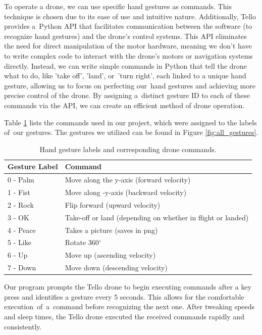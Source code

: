 To operate a drone, we can use specific hand gestures as commands. This technique is chosen due to its ease of use and intuitive nature. Additionally, Tello provides a~Python API that facilitates communication between the software (to recognize hand gestures) and the drone's control systems.
This API eliminates the need for direct manipulation of the motor hardware, meaning we don't have to write complex code to interact with the drone's motors or navigation systems directly.  Instead, we can write simple commands in Python that tell the drone what to do, like 'take off', 'land', or~'turn right', each linked to a unique hand gesture, allowing us to focus on perfecting our~hand gestures and achieving more precise control of the drone. By assigning a~distinct gesture ID to each of these commands via the API, we can create an efficient method of drone operation.



Table \ref{tab:gesture_commands} lists the commands used in our project, which were assigned to the labels of~our gestures. The gestures we utilized can be found in Figure \ref{fig:all_gestures}.

\begin{table}[ht]
	\centering
		\caption{ Hand gesture labels and corresponding drone commands. }
	\begin{tabular}{ll}
		\toprule
		Gesture Label & Command \\
		\midrule
		0 - Palm& Move along the y-axis (forward velocity) \\
		1 - Fist& Move along -y-axis (backward velocity) \\
		2 - Rock& Flip forward (upward velocity) \\
		3 - OK & Take-off or land (depending on whether in flight or landed) \\
		4 - Peace& Takes a picture (saves in png) \\
		5 - Like& Rotate 360$^\circ$ \\
		6 - Up& Move up (ascending velocity) \\
		7 - Down & Move down (descending velocity)\\
		\bottomrule
	\end{tabular}

	\label{tab:gesture_commands}
\end{table}

Our program prompts the Tello drone to begin executing commands after a key press and identifies a gesture every 5 seconds. This allows for the comfortable execution~of~a~command before recognizing the next one. After tweaking speeds and sleep times, the Tello drone executed the received commands rapidly and consistently.

